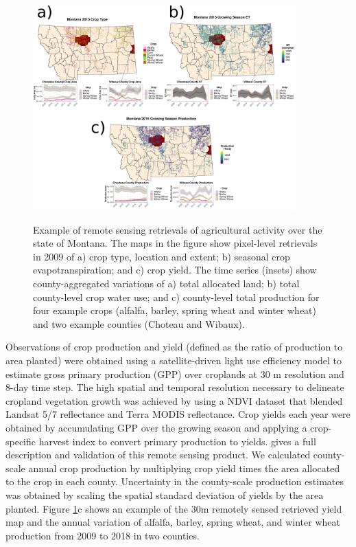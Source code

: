 \begin{figure}[t]
\includegraphics[width=0.9\textwidth]{Figures/RemoteSensingComposite.png}
\label{fig:crop_yield_map}
\caption{Example of remote sensing retrievals of agricultural activity over the state of Montana. The maps in the figure show pixel-level retrievals in 2009 of a) crop type, location and extent; b) seasonal crop evapotranspiration; and c) crop yield. The time series (insets) show county-aggregated variations of a) total allocated land; b) total county-level crop water use; and c) county-level total production for four example crops (alfalfa, barley, spring wheat and winter wheat) and two example counties (Choteau and Wibaux).  }
\end{figure}

Observations of crop production and yield (defined as the ratio of production to area planted) were obtained using a satellite-driven light use efficiency model to estimate gross primary production (GPP) over croplands at 30 m resolution and 8-day time step. The high spatial and temporal resolution necessary to delineate cropland vegetation growth was achieved by using a NDVI dataset that blended Landsat 5/7 reflectance and Terra MODIS reflectance. Crop yields each year were obtained by accumulating GPP over the growing season and applying a crop-specific harvest index to convert primary production to yields. \citet{He2018} gives a full description and validation of this remote sensing product. We calculated county-scale annual crop production by multiplying crop yield times the area allocated to the crop in each county. Uncertainty in the county-scale production estimates was obtained by scaling the spatial standard deviation of yields by the area planted. Figure \ref{fig:crop_yield_map}c shows an example of the 30m remotely sensed retrieved yield map and the annual variation of alfalfa, barley, spring wheat, and winter wheat production from 2009 to 2018 in two counties. 

